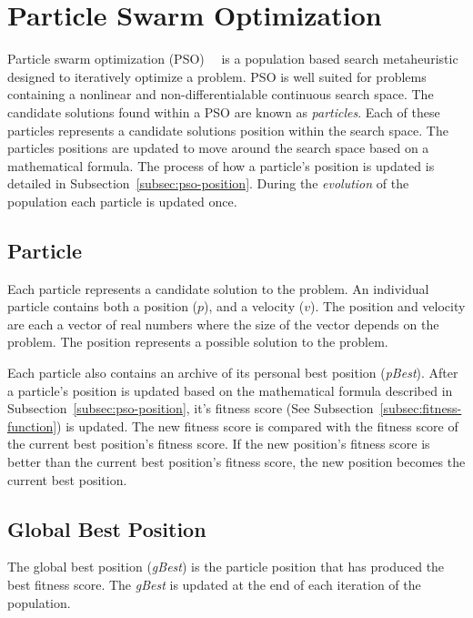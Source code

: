 \section{Particle Swarm Optimization}
\label{sec:pso}

Particle swarm optimization (PSO)~\cite{kennedy2010particle}~\cite{poli2007particle} is a population based search metaheuristic designed to iteratively optimize a problem. PSO is well suited for problems containing a nonlinear and non-differentialable continuous search space. The candidate solutions found within a PSO are known as \textit{particles}. Each of these particles represents a candidate solutions position within the search space. The particles positions are updated to move around the search space based on a mathematical formula. The process of how a particle's position is updated is detailed in Subsection~\ref{subsec:pso-position}. During the \textit{evolution} of the population each particle is updated once.

\subsection{Particle}

Each particle represents a candidate solution to the problem. An individual particle contains both a position ($p$), and a velocity ($v$). The position and velocity are each a vector of real numbers where the size of the vector depends on the problem. The position represents a possible solution to the problem.

Each particle also contains an archive of its personal best position (\textit{pBest}). After a particle's position is updated based on the mathematical formula described in Subsection~\ref{subsec:pso-position}, it's fitness score (See Subsection~\ref{subsec:fitness-function}) is updated. The new fitness score is compared with the fitness score of the current best position's fitness score. If the new position's fitness score is better than the current best position's fitness score, the new position becomes the current best position.

\subsection{Global Best Position}

The global best position (\textit{gBest}) is the particle position that has produced the best fitness score. The \textit{gBest} is updated at the end of each iteration of the population.


